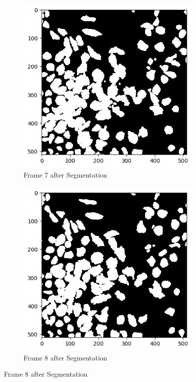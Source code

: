 \documentclass{article}
\begin{document}
\begin{figure}[h!]
  \centering
  \begin{subfigure}{0.4\textwidth}
    \includegraphics[width=\linewidth]{Report/Appendix_Images/Segmentation-A-Control/frame_7.png}
    \caption*{Frame 7 after Segmentation}
  \end{subfigure}
  \hfill
  \begin{subfigure}{0.4\textwidth}
    \includegraphics[width=\linewidth]{Report/Appendix_Images/Segmentation-A-Control/frame_8.png}
    \caption*{Frame 8 after Segmentation}
  \end{subfigure}


\end{figure}
\end{document}
